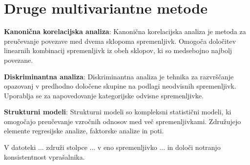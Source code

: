 \section{Druge multivariantne metode}

\textbf{Kanonična korelacijska analiza}:
Kanonična korelacijska analiza je metoda za preučevanje povezave med dvema sklopoma spremenljivk. Omogoča določitev linearnih kombinacij spremenljivk iz obeh sklopov, ki so medsebojno najbolj povezane.

\textbf{Diskriminantna analiza}:
Diskriminantna analiza je tehnika za razvrščanje opazovanj v predhodno določene skupine na podlagi neodvisnih spremenljivk. Uporablja se za napovedovanje kategorijske odvisne spremenljivke.

\textbf{Strukturni modeli}:
Strukturni modeli so kompleksni statistični modeli, ki omogočajo preučevanje vzročnih odnosov med več spremenljivkami. Združujejo elemente regresijske analize, faktorske analize in poti.

\begin{Vaje}{1}
    V datoteki ... združi stolpce ... v eno spremenljivko ... in določi notranjo konsistentnost vprašalnika.
\end{Vaje}
